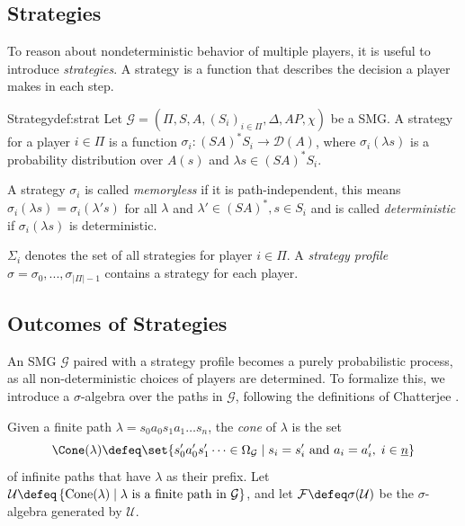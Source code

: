 \subsection{Strategies}\label{def:strat}

To reason about nondeterministic behavior of multiple players, it is useful to introduce \textit{strategies}. A strategy is a function that describes the decision a player makes in each step.
\begin{mydefinition}{Strategy}{def:strat}
Let $\mathcal{G}=(\Pi, S, A, (S_i)_{i\in\Pi}, \Delta, AP, \chi)$ be a SMG. A strategy for a player $i\in\Pi$ is a function $\sigma_i: (SA)^\ast S_i\rightarrow\mathcal{D}(A)$, 
where $\sigma_i(\lambda s)$ is a probability distribution over $A(s)$ and $\lambda s\in (SA)^\ast S_i$.
\end{mydefinition}
A strategy $\sigma_i$ is called \textit{memoryless} if it is path-independent, this means $\sigma_i(\lambda s) = \sigma_i(\lambda' s)$ for all $\lambda$ and $\lambda'\in (SA)^\ast, s\in S_i$ and is called \textit{deterministic} if $\sigma_i(\lambda s)$ is deterministic.

$\Sigma_i$ denotes the set of all strategies for player $i\in\Pi$. A \textit{strategy profile} $\sigma=\sigma_0,...,\sigma_{|\Pi|-1}$ contains a strategy for each player.


\subsection{Outcomes of Strategies}\label{sec:prop_measure}
An SMG $\mathcal{G}$ paired with a strategy profile becomes a purely probabilistic process, as all non-deterministic choices of players are determined. To formalize this, we introduce a $\sigma$-algebra over the paths in $\mathcal{G}$, following the definitions of Chatterjee \cite[Section 2.2.2]{Chatterjee07_StochasticOmegaRegularGames}.

Given a finite path $\lambda = s_0 a_0 s_1 a_1 \dots s_n$, the \textit{cone} of $\lambda$ is the set 
\[
\Cone(\lambda) \defeq \set{ s'_0 a'_0 s'_1 \dots \in \Omega_\mathcal{G} \mid s_i = s'_i \text{ and } a_i = a'_i, \; i \in \underline{n}}
\]
of infinite paths that have $\lambda$ as their prefix. Let $\mathcal{U} \defeq \left\{ \text{Cone}(\lambda) \mid \lambda \text{ is a finite path in } \mathcal{G} \right\}$, and let $\mathcal{F} \defeq \sigma(\mathcal{U})$ be the $\sigma$-algebra generated by $\mathcal{U}$.

